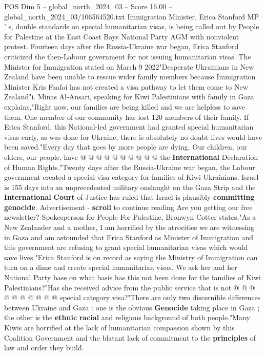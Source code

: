 \begin{textsample}{POS Dim 5 – global\_north\_2024\_03 – Score 16.00 – global\_north\_2024\_03/106564520.txt}  \label{ex:f5_pos_364}
Immigration Minister, Erica Stanford MP ' s, double standards on special humanitarian visas, is being called out by People for Palestine at the East Coast Bays National Party AGM with nonviolent protest.
Fourteen days after the Russia-Ukraine war began, Erica Stanford criticized the then-Labour government for not issuing humanitarian visas.
The Minister for Immigration stated on March 9 2022"Desperate Ukrainians in New Zealand have been unable to rescue wider family members because Immigration Minister Kris Faafoi has not created a visa pathway to let them come to New Zealand"i.
Minas Al-Ansari, speaking for Kiwi Palestinians with family in Gaza explains,"Right now, our families are being killed and we are helpless to save them.
One member of our community has lost 120 members of their family.
If Erica Stanford, this National-led government had granted special humanitarian visas early, as was done for Ukraine, there is absolutely no doubt lives would have been saved."Every day that goes by more people are dying.
Our children, our elders, our people, have @ @ @ @ @ @ @ @ @ @ the \textbf{International} Declaration of Human Rights."Twenty days after the Russia-Ukraine war began, the Labour government created a special visa category for families of Kiwi Ukrainians.
Israel is 155 days into an unprecedented military onslaught on the Gaza Strip and the \textbf{International} \textbf{Court} of Justice has ruled that Israel is plausibly \textbf{committing} \textbf{genocide}.
Advertisement - \textbf{scroll} to continue reading Are you getting our free newsletter?
Spokesperson for People For Palestine, Bronwyn Cotter states,"As a New Zealander and a mother, I am horrified by the atrocities we are witnessing in Gaza and am astounded that Erica Stanford as Minister of Immigration and this government are refusing to grant special humanitarian visas which would save lives."Erica Stanford is on record as saying the Ministry of Immigration can turn on a dime and create special humanitarian visas.
We ask her and her National Party base on what basis has this not been done for the families of Kiwi Palestinians?"Has she received advice from the public service that is not @ @ @ @ @ @ @ @ @ @ special category visa?"There are only two discernible differences between Ukraine and Gaza : one is the obvious \textbf{Genocide} taking place in Gaza ; the other is the \textbf{ethnic} \textbf{racial} and religious background of both people."Many Kiwis are horrified at the lack of humanitarian compassion shown by this Coalition Government and the blatant lack of commitment to the \textbf{principles} of law and order they build.

\end{textsample}

